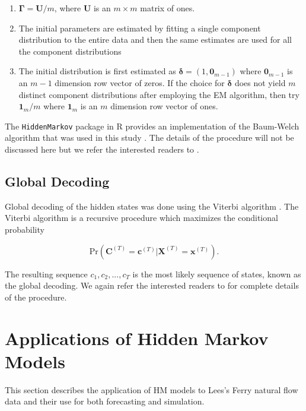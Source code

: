 \documentclass[wrr]{AGUTeX}
\begin{document}
\begin{article}
\begin{enumerate}
\item $\boldsymbol{\Gamma} = \mathbf{U}/m$, where $\mathbf{U}$ is an $m\times m$ matrix of ones. 
\item The initial parameters are estimated by fitting a single component distribution to the entire data and then the same estimates are used for all the component distributions
\item The initial distribution is first estimated as $\boldsymbol{\delta}=(1,\mathbf{0}_{m-1})$ where $\mathbf{0}_{m-1}$ is an $m-1$ dimension row vector of zeros. If the choice for $\boldsymbol{\delta}$ does not yield $m$ distinct component distributions after employing the EM algorithm, then try $\mathbf{1}_m/m$ where $\mathbf{1}_{m}$ is an $m$ dimension row vector of ones. 
\end{enumerate}

The \texttt{HiddenMarkov} package in R provides an implementation of the Baum-Welch algorithm that was used in this study \citep{Harte:2011ta}. The details of the procedure will not be discussed here but we refer the interested readers to \citep{Zucchini:2009vl}.

\subsection{Global Decoding}

Global decoding of the hidden states was done using the Viterbi algorithm \citep{Forney:1973kt}.  The Viterbi algorithm is a recursive procedure which maximizes the conditional probability

\begin{equation}
\mbox{Pr}(\mathbf{C}^{(T)} = \mathbf{c}^{(T)} | \mathbf{X}^{(T)} =\mathbf{x}^{(T)}).
\end{equation}

The resulting sequence $c_1,c_2,...,c_T$ is the most likely sequence of states, known as the global decoding. We again refer the interested readers to \citep{Zucchini:2009vl} for complete details of the procedure.


\section{Applications of Hidden Markov Models} 

This section describes the application of HM models to Lees's Ferry natural flow data and their use for both forecasting and simulation.


\end{article}
\end{document}
